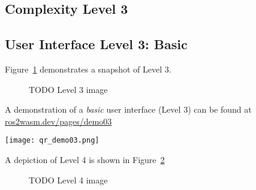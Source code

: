         \subsection{Complexity Level 3}




        \subsection{User Interface Level 3: Basic}




        Figure~\ref{fig:ui3} demonstrates a snapshot of Level 3.

        \begin{figure}[htbp]
            \centering
            \caption{TODO Level 3 image}\label{fig:ui3}
        \end{figure}

        \begin{tcolorbox}[title=Example 6]
            \begin{minipage}[t]{0.87\linewidth}
                \vspace*{0.5\baselineskip}
                A demonstration of a \textit{basic} user interface (Level 3) can
                be found at \href{https://ros2wasm.dev/pages/demo03/index.html}{\textsf{ros2wasm.dev/pages/demo03}}
            \end{minipage}\hfill%
            \begin{minipage}[t]{0.1\linewidth}
                \vspace*{0pt}
                \texttt{[image: qr\_demo03.png]}
            \end{minipage}
        \end{tcolorbox}

        A depiction of Level 4 is shown in Figure~\ref{fig:ui4}

        \begin{figure}[htbp]
            \centering
            \caption{TODO Level 4 image}\label{fig:ui4}
        \end{figure}

